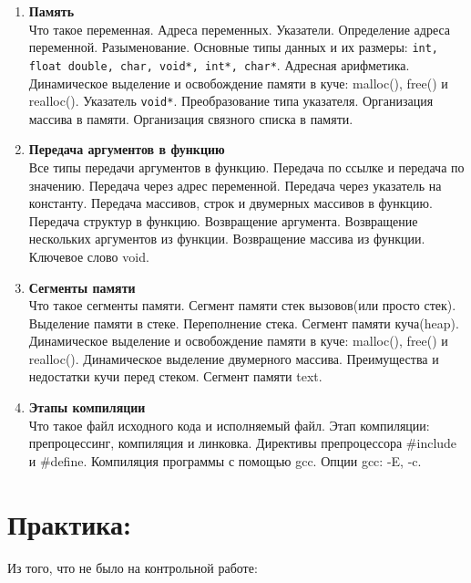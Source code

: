 \documentclass{article}
\begin{document}
\begin{enumerate}
\item \textbf{Память}\\
Что такое переменная. Адреса переменных. Указатели. Определение адреса переменной. Разыменование. Основные типы данных и их размеры: \texttt{int, float double, char, void*, int*, char*}. Адресная арифметика. Динамическое выделение и освобождение памяти в куче: malloc(), free() и realloc(). Указатель \texttt{void*}. Преобразование типа указателя. Организация массива в памяти. Организация связного списка в памяти.\\

\item \textbf{Передача аргументов в функцию}\\
Все типы передачи аргументов в функцию. Передача по ссылке и передача по значению. Передача через адрес переменной. Передача через указатель на константу. Передача массивов, строк и двумерных массивов в функцию. Передача структур в функцию. Возвращение аргумента. Возвращение нескольких аргументов из функции. Возвращение массива из функции. Ключевое слово void.\\

\item \textbf{Сегменты памяти}\\
Что такое сегменты памяти. Сегмент памяти стек вызовов(или просто стек). Выделение памяти в стеке. Переполнение стека. Сегмент памяти куча(heap). Динамическое выделение и освобождение памяти в куче: malloc(), free() и realloc(). Динамическое выделение двумерного массива. Преимущества и недостатки кучи перед стеком. Сегмент памяти text.\\

\item \textbf{Этапы компиляции}\\
Что такое файл исходного кода и исполняемый файл. Этап компиляции: препроцессинг, компиляция и линковка. Директивы препроцессора \#include и \#define. Компиляция программы с помощью gcc. Опции gcc: -E, -c.

\end{enumerate}



\newpage
\section*{Практика:}
Из того, что не было на контрольной работе:
\end{document}
